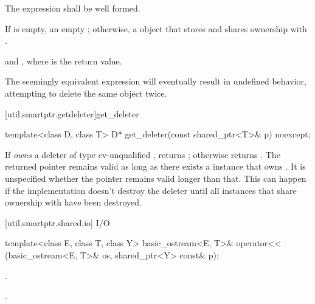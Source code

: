 \begin{itemdescr}
\pnum\requires  The expression  shall
be well formed.

\pnum\returns  If  is empty, an empty ; otherwise, a
 object that stores  and shares
ownership with .

\pnum
\postconditions {} and
, where  is the return value.

\pnum \enternote The seemingly equivalent expression
 will eventually result in
undefined behavior, attempting to delete the same object twice. \exitnote
\end{itemdescr}

[util.smartptr.getdeleter]{get_deleter}

%
%
\begin{itemdecl}
template<class D, class T> D* get_deleter(const shared_ptr<T>& p) noexcept;
\end{itemdecl}

\begin{itemdescr}
\pnum\returns  If  \textit{owns} a deleter  of type cv-unqualified
, returns ; otherwise returns .
The returned
pointer remains valid as long as there exists a  instance
that owns . \enternote It is unspecified whether the pointer
remains valid longer than that. This can happen if the implementation doesn't destroy
the deleter until all  instances that share ownership with
 have been destroyed. \exitnote
\end{itemdescr}

[util.smartptr.shared.io]{ I/O}

%
%
\begin{itemdecl}
template<class E, class T, class Y>
  basic_ostream<E, T>& operator<< (basic_ostream<E, T>& os, shared_ptr<Y> const& p);
\end{itemdecl}

\begin{itemdescr}
\pnum\effects  {}.

\pnum\returns  {}.
\end{itemdescr}

